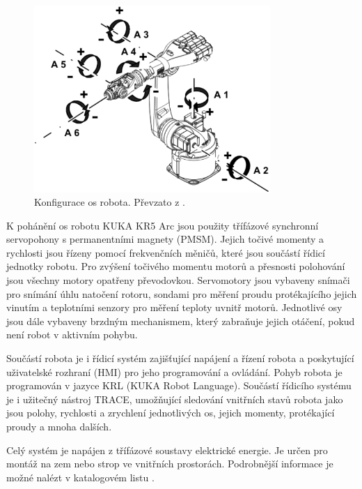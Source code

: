 \begin{figure}[ht]
\includegraphics[width=0.8\textwidth]{kuka_kr5_axes}
\caption{Konfigurace os robota. Převzato z \cite{kuka_datasheet_url}.}
\label{kuka_kr5_axes_pic}
\end{figure}

K pohánění os robotu KUKA KR5 Arc jsou použity třífázové synchronní servopohony s permanentními magnety (PMSM). Jejich točivé momenty a rychlosti jsou řízeny pomocí frekvenčních měničů, které jsou součástí řídicí jednotky robotu. Pro zvýšení točivého momentu motorů a přesnosti polohování jsou všechny motory opatřeny převodovkou. Servomotory jsou vybaveny snímači pro snímání úhlu natočení rotoru, sondami pro měření proudu protékajícího jejich vinutím a teplotními senzory pro měření teploty uvnitř motorů. Jednotlivé osy jsou dále vybaveny brzdným mechanismem, který zabraňuje jejich otáčení, pokud není robot v aktivním pohybu. 

Součástí robota je i řídicí systém zajišťující napájení a řízení robota a poskytující uživatelské rozhraní (HMI) pro jeho programování a ovládání. Pohyb robota je programován v jazyce KRL (KUKA Robot Language). Součástí řídicího systému je i užitečný nástroj TRACE, umožňující sledování vnitřních stavů robota jako jsou polohy, rychlosti a zrychlení jednotlivých os, jejich momenty, protékající proudy a mnoha dalších. 

Celý systém je napájen z třífázové soustavy elektrické energie. Je určen pro montáž na zem nebo strop ve vnitřních prostorách. Podrobnější informace je možné nalézt v katalogovém listu \cite{kuka_datasheet_url}.